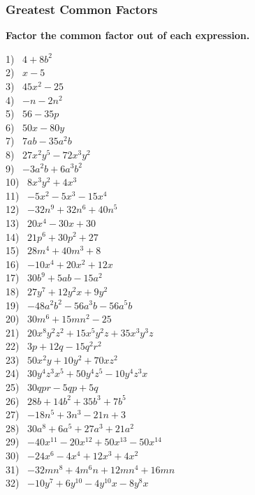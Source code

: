 \documentclass[12pt]{book}
\theoremstyle{definition}
\begin{document}
\subsubsection{Greatest Common Factors}

{\bf Factor the common factor out of each expression.}

\begin{multicols}{2}
  1)~ $4 + 8 b^2$\\
  2)~ $x - 5$\\
  3)~ $45 x^2 - 25$\\
  4)~ $-n - 2 n^2$\\
  5)~ $56 - 35 p$\\
  6)~ $50 x - 80 y$\\
  7)~ $7 ab - 35 a^2 b$\\
  8)~ $27 x^2 y^5 - 72 x^3 y^2$\\
  9)~ $- 3 a^2 b + 6 a^3 b^2$\\
  10)~ $8 x^3 y^2 + 4 x^3$\\
  11)~ $- 5 x^2 - 5 x^3 - 15 x^4$\\
  12)~ $- 32 n^9 + 32 n^6 + 40 n^5$\\
  13)~ $20 x^4 - 30 x + 30$\\
  14)~ $21 p^6 + 30 p^2 + 27$\\
  15)~ $28 m^4 + 40 m^3 + 8$\\
  16)~ $- 10 x^4 + 20 x^2 + 12 x$\\
  17)~ $30 b^9 + 5 a b - 15 a^2$\\
  18)~ $27 y^7 + 12 y^2 x + 9 y^2$\\
  19)~ $- 48 a^2 b^2 - 56 a^3 b - 56 a^5 b$\\
  20)~ $30 m^6 + 15 m n^2 - 25$\\
  21)~ $20 x^8 y^2 z^2 + 15 x^5 y^2 z + 35 x^3 y^3 z$\\
  22)~ $3 p + 12 q - 15 q^2 r^2$\\
  23)~ $50 x^2 y + 10 y^2 + 70 x z^2$\\
  24)~ $30 y^4 z^3 x^5 + 50 y^4 z^5 - 10 y^4 z^3 x$\\
  25)~ $30 q p r - 5 q p + 5 q$\\
  26)~ $28 b + 14 b^2 + 35 b^3 + 7 b^5$\\
  27)~ $- 18 n^5 + 3 n^3 - 21 n + 3$\\
  28)~ $30 a^8 + 6 a^5 + 27 a^3 + 21 a^2$\\
  29)~ $- 40 x^{11} - 20 x^{12} + 50 x^{13} - 50 x^{14}$\\
  30)~ $- 24 x^6 - 4 x^4 + 12 x^3 + 4 x^2$\\
  31)~ $- 32 m n^8 + 4 m^6 n + 12 m n^4 + 16 m n$\\
  32)~ $- 10 y^7 + 6 y^{10} - 4 y^{10} x - 8 y^8 x$
\end{multicols}
\end{document}
